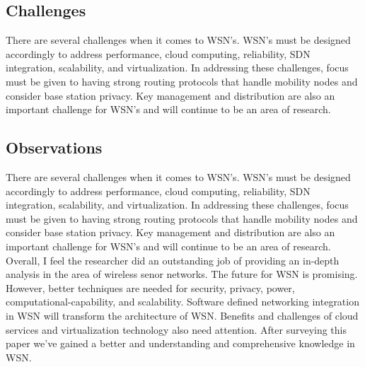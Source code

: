 \subsection {Challenges} 
\smallskip

There are several challenges when it comes to WSN’s. WSN’s must be designed accordingly to address performance, cloud computing, reliability, SDN integration, scalability, and virtualization. In addressing these challenges, focus must be given to having strong routing protocols that handle mobility nodes and consider base station privacy. Key management and distribution are also an important challenge for WSN’s and will continue to be an area of research.

\subsection {Observations}
\smallskip

There are several challenges when it comes to WSN’s. WSN’s must be designed accordingly to address performance, cloud computing, reliability, SDN integration, scalability, and virtualization. In addressing these challenges, focus must be given to having strong routing protocols that handle mobility nodes and consider base station privacy. Key management and distribution are also an important challenge for WSN’s and will continue to be an area of research. Overall, I feel the researcher did an outstanding job of providing an in-depth analysis in the area of wireless senor networks. The future for WSN is promising. However, better techniques are needed for security, privacy, power, computational-capability, and scalability. Software defined networking integration in WSN will transform the architecture of WSN. Benefits and challenges of cloud services and virtualization technology also need attention. After surveying this paper we’ve gained a better and understanding and comprehensive knowledge in WSN.

